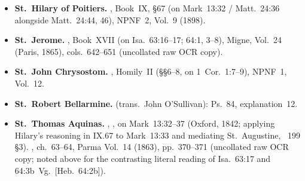 \begin{itemize}[leftmargin=1.5em,itemsep=0.25em]
\item \textbf{St.~Hilary of Poitiers.} , Book~IX, §67 (on Mark~13:32 / Matt.~24:36 alongside Matt.~24:44, 46), NPNF~2, Vol.~9 (1898).

\item \textbf{St.~Jerome.} , Book~XVII (on Isa.~63:16--17; 64:1, 3--8), Migne,  Vol.~24 (Paris, 1865), cols.~642--651 (uncollated raw OCR copy).

\item \textbf{St.~John Chrysostom.} , Homily~II (§§6--8, on 1~Cor.~1:7--9), NPNF~1, Vol.~12.

\item \textbf{St.~Robert Bellarmine.}  (trans.\ John O'Sullivan): Ps.~84, explanation~12.

\item \textbf{St.~Thomas Aquinas.} , , on Mark~13:32--37 (Oxford, 1842; applying Hilary's reasoning in  IX.67 to Mark~13:33 and mediating St.~Augustine, ~199 §3). , ch.~63--64, Parma Vol.~14 (1863), pp.~370--371 (uncollated raw OCR copy; noted above for the contrasting literal reading of Isa.~63:17 and 64:3b~Vg.\ [Heb.~64:2b]).

\end{itemize}
